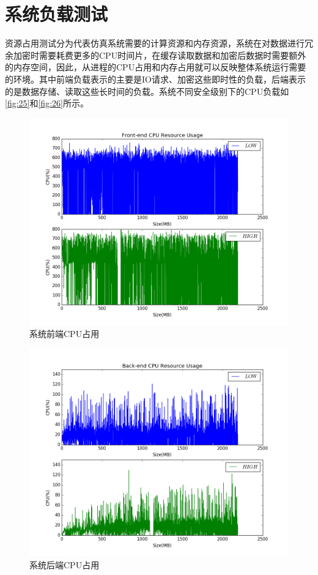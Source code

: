 \section{系统负载测试}
资源占用测试分为代表仿真系统需要的计算资源和内存资源，系统在对数据进行冗余加密时需要耗费更多的CPU时间片，在缓存读取数据和加密后数据时需要额外的内存空间，因此，从进程的CPU占用和内存占用就可以反映整体系统运行需要的环境。其中前端负载表示的主要是IO请求、加密这些即时性的负载，后端表示的是数据存储、读取这些长时间的负载。系统不同安全级别下的CPU负载如\autoref{fig:25}和\autoref{fig:26}所示。
\begin{figure}[H]
	\centering
	\includegraphics[width=1\textwidth]{Pics/figure_cpu_client.png}
	\caption{系统前端CPU占用}
	\label{fig:25}
\end{figure}
\begin{figure}[H]
	\centering
	\includegraphics[width=1\textwidth]{Pics/figure_cpu_server.png}
	\caption{系统后端CPU占用}
	\label{fig:26}
\end{figure}
